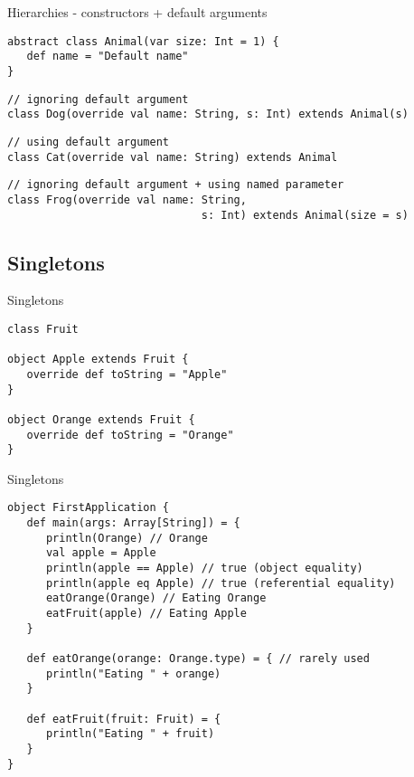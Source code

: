 \begin{frame}[fragile]{Hierarchies - constructors + default arguments}
\begin{lstlisting}
abstract class Animal(var size: Int = 1) {
   def name = "Default name"
}
\end{lstlisting}

\begin{lstlisting}
// ignoring default argument
class Dog(override val name: String, s: Int) extends Animal(s)
\end{lstlisting}

\begin{lstlisting}
// using default argument
class Cat(override val name: String) extends Animal
\end{lstlisting}

\begin{lstlisting}
// ignoring default argument + using named parameter
class Frog(override val name: String,
                              s: Int) extends Animal(size = s)
\end{lstlisting}
\end{frame}

\subsection{Singletons}
\begin{frame}[fragile]{Singletons}
\begin{lstlisting}
class Fruit

object Apple extends Fruit {
   override def toString = "Apple"
}

object Orange extends Fruit {
   override def toString = "Orange"
}
\end{lstlisting}
\end{frame}

\begin{frame}[fragile]{Singletons}
\begin{lstlisting}
object FirstApplication {
   def main(args: Array[String]) = {
      println(Orange) // Orange
      val apple = Apple
      println(apple == Apple) // true (object equality)
      println(apple eq Apple) // true (referential equality)
      eatOrange(Orange) // Eating Orange
      eatFruit(apple) // Eating Apple
   }
   
   def eatOrange(orange: Orange.type) = { // rarely used
      println("Eating " + orange)
   }
   
   def eatFruit(fruit: Fruit) = {
      println("Eating " + fruit)
   }
}
\end{lstlisting}
\end{frame}

